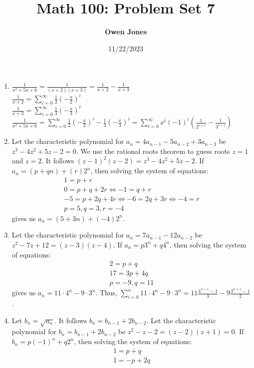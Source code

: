 \documentclass[10pt]{article}
\title{\bf Math 100: Problem Set 7}
\date{11/22/2023}
\author{\bf Owen Jones}
\begin{document}
\maketitle
\begin{enumerate}[label= (Q-\arabic*)]
    \item $\frac{1}{x^2+5x+6}=\frac{1}{(x+2)(x+3)}=\frac{1}{x+2}-\frac{1}{x+3}$\\
    $\displaystyle\frac{1}{x+2}=\sum_{i=0}^{\infty}\frac{1}{2}{(-\frac{x}{2})}^i$\\
    $\displaystyle\frac{1}{x+3}=\sum_{i=0}^{\infty}\frac{1}{3}{(-\frac{x}{3})}^i$\\
    $\displaystyle\frac{1}{x^2+5x+6}=\sum_{i=0}^{\infty}\frac{1}{2}{(-\frac{x}{2})}^i-\frac{1}{3}{(-\frac{x}{3})}^i=\sum_{i=0}^{\infty}x^i{(-1)}^i(\frac{1}{2^{i+1}}-\frac{1}{3^{i+1}})$
    \item Let the characteristic polynomial for $a_n=4a_{n-1}-5a_{n-2}+3a_{n-3}$ be $z^3-4z^2+5z-2=0$. 
    We use the rational roots theorem to guess roots $z=1$ and $z=2$. 
    It follows ${(z-1)}^2(z-2)=z^3-4z^2+5z-2$.
    If $a_n=(p+qn)+(r)2^n$, then solving the system of equations:
    \begin{align*}
        1=p+r\\
        0=p+q+2r\Leftrightarrow -1=q+r\\
        -5=p+2q+4r\Leftrightarrow -6=2q+3r\Leftrightarrow -4=r\\
        p=5,q=3,r=-4
    \end{align*}
    gives us $a_n=(5+3n)+(-4)2^n$.
    \item Let the characteristic polynomial for $a_n=7a_{n-1}-12a_{n-2}$ be $z^2-7z+12=(z-3)(z-4)$.
    If $a_n=p3^n+q4^n$, then solving the system of equations:
    \begin{align*}
        2=p+q\\
        17=3p+4q\\
        p=-9,q=11
    \end{align*}
    gives us $a_n=11\cdot4^n-9\cdot3^n$.
    Thus, $\displaystyle\sum_{i=0}^{n}11\cdot4^n-9\cdot3^n=11\frac{4^{n+1}-1}{3}-9\frac{3^{n+1}-1}{2}$.
    \item Let $b_n=\sqrt{a_n}$. It follows $b_n=b_{n-1}+2b_{n-2}$. 
    Let the characteristic polynomial for $b_n=b_{n-1}+2b_{n-2}$ be $z^2-z-2=(z-2)(z+1)=0$.
    If $b_n=p{(-1)}^n+q2^n$, then solving the system of equations:
    \begin{align*}
        1=p+q\\
        1=-p+2q\\

\end{align*}
\end{enumerate}
\end{document}

